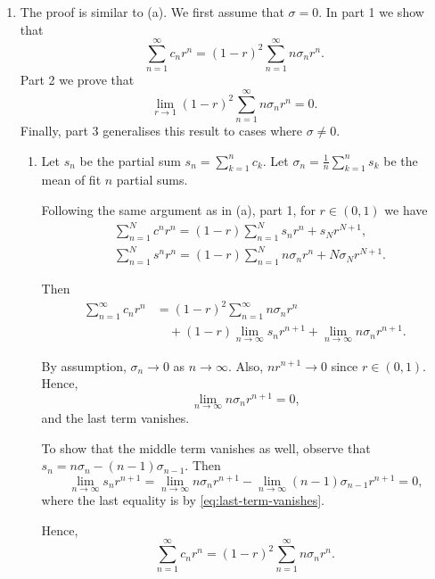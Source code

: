 \documentclass[oneside]{article}
\begin{document}
\begin{enumerate}[label=(\alph*)]
  \item The proof is similar to (a). We first assume that $\sigma = 0$. In part
    1 we show that  \[
      \sum_{n=1}^\infty c_nr^n = (1-r)^2\sum_{n=1}^\infty n \sigma_n r^n\text{.}
    \] Part 2 we prove that \[
      \lim_{r\to1}(1-r)^2\sum_{n=1}^\infty n \sigma_n r^n = 0\text{.}
    \] Finally, part 3 generalises this result to cases where $\sigma \neq 0$.

    \begin{enumerate}[label=\textbf{\arabic*.}]
      \item Let $s_n$ be the partial sum $s_n = \sum_{k=1}^n c_k$. Let
        $\sigma_n = \frac1n\sum_{k=1}^ns_k$ be the mean of fit $n$ partial sums.

        Following the same argument as in (a), part 1, for $r\in(0,1)$ we have
        \begin{align*}
          &\sum_{n=1}^Nc^nr^n = (1-r)\sum_{n=1}^N s_nr^n + s_Nr^{N+1}
          \text{,} \\
          &\sum_{n=1}^Ns^nr^n
          = (1-r)\sum_{n=1}^N n\sigma_nr^n + N\sigma_Nr^{N+1}
          \text{.}
        \end{align*}

        Then\begin{align*}
          \sum_{n=1}^\infty c_nr^n
          &= (1-r)^2 \sum_{n=1}^\infty n\sigma_nr^n \\
          &\quad + (1-r)\lim_{n\to\infty}s_nr^{n+1}
          + \lim_{n\to\infty}n\sigma_nr^{n+1}
          \text{.}
        \end{align*}

        By assumption, $\sigma_n\to0$ as $n\to\infty$. Also, $nr^{n+1}\to0$
        since $r \in (0,1)$. Hence, \begin{equation}
          \label{eq:last-term-vanishes}
          \lim_{n\to\infty}n\sigma_nr^{n+1}=0\text{,}
        \end{equation}and the last
        term vanishes.

        To show that the middle term vanishes as well, observe that
        $s_n = n\sigma_n - (n - 1)\sigma_{n-1}$. Then \[
          \lim_{n\to\infty}s_nr^{n+1}
          = \lim_{n\to\infty}n\sigma_nr^{n+1}
          - \lim_{n\to\infty}(n - 1)\sigma_{n-1}r^{n+1}
          = 0\text{,}
        \] where the last equality is by \eqref{eq:last-term-vanishes}.

        Hence,\[
          \sum_{n=1}^\infty c_nr^n = (1-r)^2 \sum_{n=1}^\infty n\sigma_nr^n
          \text{.}
        \]


\end{enumerate}
\end{enumerate}
\end{document}
